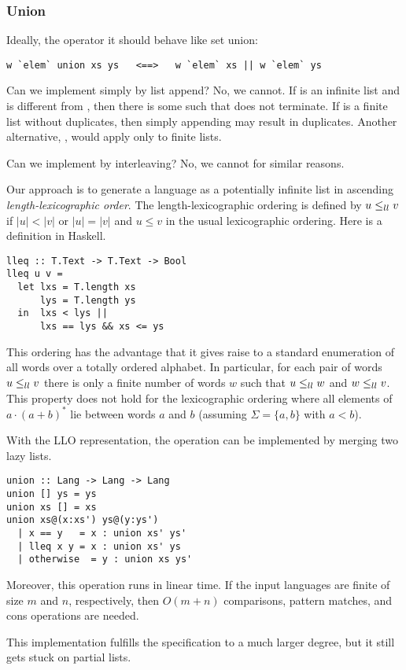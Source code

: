\subsubsection{Union}
Ideally, the  operator it should behave like
set union:
\begin{lstlisting}
w `elem` union xs ys   <==>   w `elem` xs || w `elem` ys
\end{lstlisting}
Can we implement  simply by list append?
No, we cannot. 
If  is an infinite list and  is different from
, then there is some  such that
 does not terminate.
If  is a finite list without duplicates, then simply
appending  may result in duplicates.
Another alternative, , would apply only to finite lists.

Can we implement  by interleaving? No, we cannot for
similar reasons.

Our approach is to generate a language as a potentially infinite list
in ascending \emph{length-lexicographic order}. The
length-lexicographic ordering is defined by $u \le_{ll} 
v$ if $|u|<|v|$ or $|u|=|v|$ and $u\le v$ in the usual lexicographic
ordering. Here is a definition in Haskell.
\begin{lstlisting}
lleq :: T.Text -> T.Text -> Bool
lleq u v =
  let lxs = T.length xs
      lys = T.length ys
  in  lxs < lys ||
      lxs == lys && xs <= ys
\end{lstlisting}
This ordering has the advantage that it gives raise to a standard
enumeration of all words over a totally ordered alphabet. In
particular, for each pair of words $u \le_{ll} v$ there is only a finite
number of words $w$ such that $u \le_{ll} w$ and $w \le_{ll} v$. This property does
not hold for the lexicographic ordering where all elements of $a\cdot
(a+b)^*$ lie between words $a$ and $b$ (assuming $\Sigma = \{a, b\}$
with $a<b$).

With the LLO representation, the  operation can be
implemented by merging two lazy lists.
\begin{lstlisting}
union :: Lang -> Lang -> Lang
union [] ys = ys
union xs [] = xs
union xs@(x:xs') ys@(y:ys')
  | x == y   = x : union xs' ys'
  | lleq x y = x : union xs' ys
  | otherwise  = y : union xs ys'
\end{lstlisting}
Moreover, this operation runs in linear time. If the input languages
are finite of size $m$ and $n$, respectively, then $O(m+n)$
comparisons, pattern matches, and cons operations are needed.

This implementation fulfills the specification to a much larger
degree, but it still gets stuck on partial lists.

